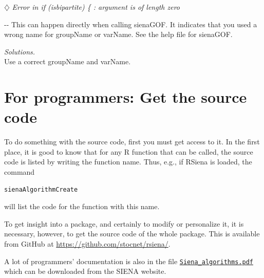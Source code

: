 \documentclass[a4paper,fleqn,11pt]{article}
\makeatletter
\newcommand{\+}{\, + \,}
\newcommand{\sfn}[1]{\textsf{#1}}
\newcommand{\R}{{\sf R }}
\newcommand{\RS}{{\sf \textsf{RSiena} }}
\newcommand{\SI}{{\sf SIENA }}
\newenvironment{indentation}[2]
{\par \setlength{\leftmargin}{#1}       \setlength{\rightmargin}{#2}
  \advance\linewidth -\leftmargin       \advance\linewidth -\rightmargin
  \advance\@totalleftmargin\leftmargin  \@setpar{{\@@par}}%
  \parshape 1 \@totalleftmargin         \linewidth \ignorespaces}{\par}
\makeatother
\begin{document}
\noindent
$\diamondsuit$
\emph{Error in if (isbipartite) \{ : argument is of length zero }
\smallskip

\begin{indentation}{0.04\textwidth}{0pt}
\noindent
This can happen directly when calling \textsf{sienaGOF}.
It indicates that you used a wrong name for \sfn{groupName} or \sfn{varName}.
See the help file for \textsf{sienaGOF}.
\smallskip

\noindent
\emph{Solutions.} \\
Use a correct \sfn{groupName} and \sfn{varName}.
\end{indentation}

\newpage

\section{For programmers: Get the source code}

To do something with the source code,
first you must get access to it.
In the first place, it is good to know that for any \R function
that can be called,
the source code is listed by writing the function name.
Thus, e.g., if \RS is loaded, the command
\begin{verbatim}
sienaAlgorithmCreate
\end{verbatim}
will list the code for the function with this name.

To get insight into a package, and certainly to modify
or personalize it, it is necessary, however,
to get the source code of the whole package.
This is available from GitHub at
\url{https://github.com/stocnet/rsiena/}.

A lot of programmers' documentation is also in the file
\href{http://www.stats.ox.ac.uk/~snijders/siena/Siena_algorithms.pdf}{\texttt{Siena\_algorithms.pdf}}
which can be downloaded from the
\SI website.
\end{document}
